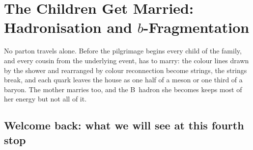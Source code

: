 \providecommand{\mT}{\ensuremath{m_{\mathrm{T}}}\xspace}
\providecommand{\xE}{\ensuremath{x_E}\xspace}
\providecommand{\xpt}{\ensuremath{x_{p_{\mathrm{T}}}}\xspace}
\providecommand{\Wmin}{\ensuremath{W_{\min}}\xspace}
\providecommand{\Bstarbar}{\ensuremath{\bar B^{*0}}\xspace}
\providecommand{\Bstar}{\ensuremath{B^{*0}}\xspace}
\chapter{The Children Get Married: Hadronisation and $b$-Fragmentation}
\label{ch:children_getting_married}

\begin{journeybox}
No parton travels alone. Before the pilgrimage begins every child of the
family, and every cousin from the underlying event, has to marry: the colour
lines drawn by the shower and rearranged by colour reconnection become strings,
the strings break, and each quark leaves the house as one half of a meson or
one third of a baryon. The mother marries too, and the B~hadron she becomes
keeps most of her energy but not all of it.
\end{journeybox}


\section{Welcome back: what we will see at this fourth stop}
\label{sec:children_getting_married:what_we_compute}


